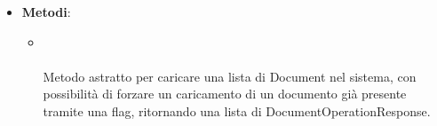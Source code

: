 \documentclass[10pt, a4paper]{article}
\begin{document}
\begin{comment} %
\subsubsubsection{SubstituteDocumentController}
\label{SubstituteDocumentControllerDettaglio}
\begin{itemize}
    \item \textbf{Attributi}:
    \begin{itemize}
        \item \code{useCase: UploadDocumentsUseCase}.
    \end{itemize}
    \item \textbf{Metodi}:
    \begin{itemize}
        \item \code{substituteDocuments(newDocumentIds:List<string>):}\\ \code{List<DocumentOperationResponse>}\\
        Metodo che effettua la sostituzione di una lista di NewDocument tramite useCase, ritornando una lista di DocumentOperationResponse;
        \item \code{getTempDocument(documentId:string): Document}\\
        Metodo che recupera un documento caricato precedentemente dall'utente, a partire dal suo id, trasformandolo in oggetto Document della business logic.
    \end{itemize}
\end{itemize}
\end{comment}

\label{UploadDocumentsUseCaseDettaglio}
\begin{itemize}
    \item \textbf{Metodi}:
    \begin{itemize}
        \item {}\\ \\
        Metodo astratto per caricare una lista di Document nel sistema, con possibilità di forzare un caricamento di un documento già presente tramite una flag, ritornando una lista di DocumentOperationResponse.
    \end{itemize}
\end{itemize}
\end{document}
